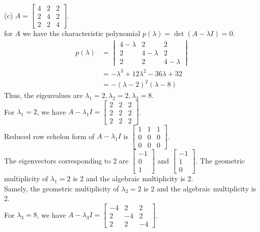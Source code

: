 (c) $A=\begin{bmatrix} 4 & 2 & 2 \\ 2 & 4 & 2 \\ 2 & 2 & 4 \end{bmatrix}$.\\
for $A$ we have the characteristic polynomial $p(\lambda) = \det(A - \lambda I) = 0$.
\begin{align*}
    p(\lambda) &= \begin{vmatrix} 4-\lambda & 2 & 2 \\ 2 & 4-\lambda & 2 \\ 2 & 2 & 4-\lambda \end{vmatrix} \\
    &= -\lambda^3 + 12\lambda^2 - 36\lambda + 32 \\
    &= -(\lambda - 2)^2(\lambda - 8)
\end{align*}
Thus, the eigenvalues are $\lambda_1 = 2, \lambda_2 = 2, \lambda_3 = 8$.\\
For $\lambda_1 = 2$, we have $A - \lambda_1 I = \begin{bmatrix} 2 & 2 & 2 \\ 2 & 2 & 2 \\ 2 & 2 & 2 \end{bmatrix}$.\\
Reduced row echelon form of $A - \lambda_1 I$ is $\begin{bmatrix} 1 & 1 & 1 \\ 0 & 0 & 0 \\ 0 & 0 & 0 \end{bmatrix}$.\\
The eigenvectors corresponding to 2 are $\begin{bmatrix} -1 \\ 0 \\ 1 \end{bmatrix}$ and $\begin{bmatrix} -1 \\ 1 \\ 0 \end{bmatrix}$. The geometric multiplicity of $\lambda_1 = 2$ is 2 and the algebraic multiplicity is 2.\\
Samely, the geometric multiplicity of $\lambda_2 = 2$ is 2 and the algebraic multiplicity is 2.\\
For $\lambda_3 = 8$, we have $A - \lambda_3 I = \begin{bmatrix} -4 & 2 & 2 \\ 2 & -4 & 2 \\ 2 & 2 & -4 \end{bmatrix}$.\\
